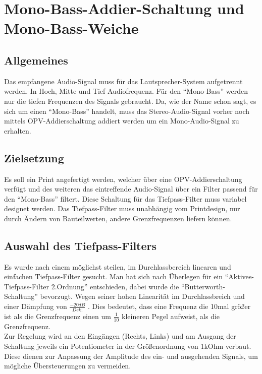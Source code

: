 \section{Mono-Bass-Addier-Schaltung und Mono-Bass-Weiche}\label{kap:5.1}
\subsection{Allgemeines}\label{kap:5.1.1}
Das empfangene Audio-Signal muss für das Lautsprecher-System aufgetrennt werden. In Hoch, Mitte und Tief Audiofrequenz. Für den \enquote{Mono-Bass} werden nur die tiefen Frequenzen des Signals gebraucht. Da, wie der Name schon sagt, es sich um einen \enquote{Mono-Bass} handelt, muss das Stereo-Audio-Signal vorher noch mittels OPV-Addierschaltung addiert werden um ein Mono-Audio-Signal zu erhalten.

\subsection{Zielsetzung}\label{kap:5.1.2}
Es soll ein Print angefertigt werden, welcher über eine OPV-Addierschaltung verfügt und des weiteren das eintreffende Audio-Signal über ein Filter passend für den \enquote{Mono-Bass} filtert.
Diese Schaltung für das Tiefpass-Filter muss variabel designet werden. Das Tiefpass-Filter muss unabhängig vom Printdesign, nur durch Ändern von Bauteilwerten, andere Grenzfrequenzen liefern können.

\subsection{Auswahl des Tiefpass-Filters}\label{kap:5.1.3}
Es wurde nach einem möglichst steilen, im Durchlassbereich linearen und einfachen Tiefpass-Filter gesucht. Man hat sich nach Überlegen für ein \enquote{Aktives-Tiefpass-Filter 2.Ordnung} entschieden, dabei wurde die \enquote{Butterworth-Schaltung} bevorzugt. Wegen seiner hohen Linearität im Durchlassbreich und einer Dämpfung von $\frac{-20dB}{Dek.}$ . Dies bedeutet, dass eine Frequenz die 10mal größer ist als die Grenzfrequenz einen um $\frac{1}{10}$ kleineren Pegel aufweist, als die Grenzfrequenz.\\
Zur Regelung wird an den Eingängen (Rechts, Links) und am Ausgang der Schaltung jeweils ein Potentiometer in der Größenordnung von 1kOhm verbaut. Diese dienen zur Anpassung der Amplitude des ein- und ausgehenden Signals, um mögliche Übersteuerungen zu vermeiden.

